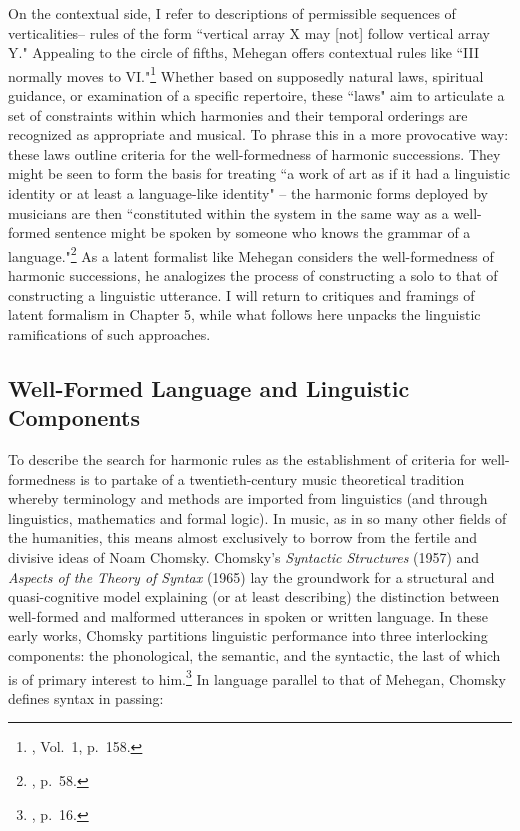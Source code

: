 On the contextual side, I refer to descriptions of permissible sequences of verticalities-- rules of the form ``vertical array X may [not] follow vertical array Y."  Appealing to the circle of fifths, Mehegan offers contextual rules like ``III normally moves to VI."\footnote{\cite{mehegan1959}, Vol.\ 1, p.\ 158.}  Whether based on supposedly natural laws, spiritual guidance, or examination of a specific repertoire, these ``laws" aim to articulate a set of constraints within which harmonies and their temporal orderings are recognized as appropriate and musical.  To phrase this in a more provocative way: these laws outline criteria for the well-formedness of harmonic successions.  They might be seen to form the basis for treating ``a work of art as if it had a linguistic identity or at least a language-like identity" -- the harmonic forms deployed by musicians are then ``constituted within the system in the same way as a well-formed sentence might be spoken by someone who knows the grammar of a language."\footnote{\cite{davis2011}, p.\ 58.}  As a latent formalist like Mehegan considers the well-formedness of harmonic successions, he analogizes the process of constructing a solo to that of constructing a linguistic utterance.  I will return to critiques and framings of latent formalism in Chapter 5, while what follows here unpacks the linguistic ramifications of such approaches.

\subsection{Well-Formed Language and Linguistic Components}

To describe the search for harmonic rules as the establishment of criteria for well-formedness is to partake of a twentieth-century music theoretical tradition whereby terminology and methods are imported from linguistics (and through linguistics, mathematics and formal logic).  In music, as in so many other fields of the humanities, this means almost exclusively to borrow from the fertile and divisive ideas of Noam Chomsky.  Chomsky's \emph{Syntactic Structures} (1957) and \emph{Aspects of the Theory of Syntax} (1965) lay the groundwork for a structural and quasi-cognitive model explaining (or at least describing) the distinction between well-formed and malformed utterances in spoken or written language.  In these early works, Chomsky partitions linguistic performance into three interlocking components: the phonological, the semantic, and the syntactic, the last of which is of primary interest to him.\footnote{\cite{chomsky1965}, p.\ 16.}  In language parallel to that of Mehegan, Chomsky defines syntax in passing:

